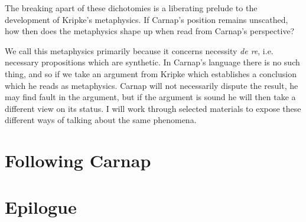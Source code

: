 The breaking apart of these dichotomies is a liberating prelude to the development
of Kripke's metaphysics.
If Carnap's position remains unscathed, how then does the metaphysics shape up
when read from Carnap's perspective?

We call this metaphysics primarily because it concerns necessity \emph{de re},
i.e. necessary propositions which are synthetic.
In Carnap's language there is no such thing, and so if we take an
argument from Kripke which establishes a conclusion which he reads as metaphysics.
Carnap will not necessarily dispute the result, he may find fault in the argument,
but if the argument is sound he will then take a different view on its status.
I will work through selected materials to expose these different ways of talking
about the same phenomena.




\chapter{Following Carnap}

\chapter{Epilogue}

\backmatter




\clearpage

\clearpage

\twocolumn[
]
{\small\printindex}

\vfil


